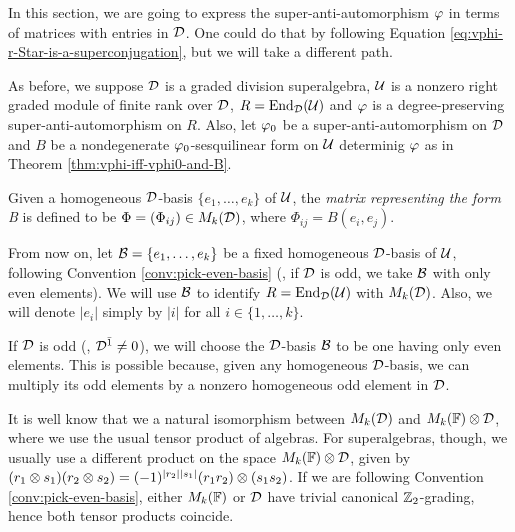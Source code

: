 In this section, we are going to express the super-anti-automorphism $\varphi$ in terms of matrices with entries in $\mathcal{D}$. 
One could do that by following Equation \eqref{eq:vphi-r-Star-is-a-superconjugation}, but we will take a different path. 

As before, we suppose $\mathcal{D}$ is a graded division superalgebra, $\mathcal U$ is a nonzero right graded module of finite rank over $\mathcal{D}$, $R = \operatorname{End}_{\mathcal{D}} (\mathcal U)$ and $\varphi$ is a degree-preserving super-anti-automorphism on $R$. 
Also, let $\varphi_0$ be a super-anti-automorphism on $\mathcal{D}$ and $B$ be a nondegenerate $\varphi_0$-sesquilinear form on $\mathcal U$ determinig $\varphi$ as in Theorem \ref{thm:vphi-iff-vphi0-and-B}.

\begin{defi}
    Given a homogeneous $\mathcal{D}$-basis $\{e_1, \ldots, e_k\}$ of $\mathcal U$, the \emph{matrix representing the form B} is defined to be $\Phi = (\Phi_{ij}) \in M_k(\mathcal{D})$, where $\Phi_{ij} = B(e_i, e_j)$.
\end{defi}

From now on, let $\mathcal B = \{e_1, \ldots, e_k\}$ be a fixed homogeneous $\mathcal{D}$-basis of $\mathcal U$, following Convention \ref{conv:pick-even-basis} (\ie, if $\mathcal{D}$ is odd, we take $\mathcal B$ with only even elements). 
We will use $\mathcal B$ to identify $R = \operatorname{End}_{\mathcal{D}} (\mathcal U)$ with $M_k (\mathcal{D})$. 
Also, we will denote $|e_i|$ simply by $|i|$ for all $i \in \{1, \ldots, k\}$. 



\begin{convention}\label{conv:pick-even-basis}
    If $\mathcal{D}$ is odd (\ie, $\mathcal{D}^{\bar1} \neq 0$), we will choose the $\mathcal{D}$-basis $\mathcal B$ to be one having only even elements. 
    This is possible because, given any homogeneous $\mathcal{D}$-basis, we can multiply its odd elements by a nonzero homogeneous odd element in $\mathcal{D}$. 
\end{convention}

\begin{remark}
    It is well know that we a natural isomorphism between $M_k(\mathcal{D})$ and $M_k(\mathbb{F})\otimes \mathcal{D}$, where we use the usual tensor product of algebras. 
    For superalgebras, though, we usually use a different product on the space $M_k(\mathbb{F})\otimes \mathcal{D}$, given by $(r_1 \otimes s_1) (r_2 \otimes s_2) = (-1)^{|r_2||s_1|} (r_1 r_2) \otimes (s_1 s_2)$. 
    If we are following Convention \ref{conv:pick-even-basis}, either $M_k(\mathbb{F})$ or $\mathcal{D}$ have trivial canonical $\mathbb{Z}_2$-grading, hence both tensor products coincide.
\end{remark}


